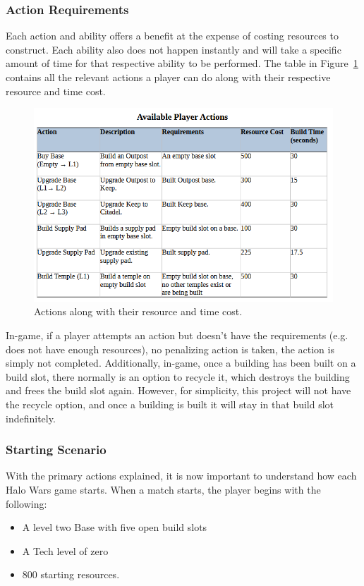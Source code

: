 \documentclass[a4paper, 12pt, english]{article}
\begin{document}
\subsubsection{Action Requirements}
Each action and ability offers a benefit at the expense of costing resources to construct. Each ability also does not happen instantly and will take a specific amount of time for that respective ability to be performed. The table in Figure~\ref{fig:ActionsChart} contains all the relevant actions a player can do along with their respective resource and time cost. 
\newline

 \begin{figure}[!ht]
 			\begin{center}
				\includegraphics[width=125mm,scale=1.0]{PlayerAvailableActionsChart.png}
			\end{center}
       		\caption{\label{fig:ActionsChart}Actions along with their resource and time cost.}
 \end{figure}

 In-game, if a player attempts an action but doesn't have the requirements (e.g. does not have enough resources), no penalizing action is taken, the action is simply not completed. Additionally, in-game, once a building has been built on a build slot, there normally is an option to recycle it, which destroys the building and frees the build slot again. However, for simplicity, this project will not have the recycle option, and once a building is built it will stay in that build slot indefinitely.

\subsubsection{Starting Scenario}
With the primary actions explained, it is now important to understand how each Halo Wars game starts. When a match starts, the player begins with the following:
		\begin{itemize}
        \item A level two Base with five open build slots
        \item A Tech level of zero
        \item 800 starting resources.
  		\end{itemize}
        
\end{document}
